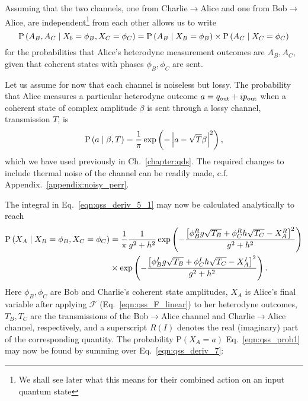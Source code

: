 Assuming that the two channels, one from Charlie$\rightarrow$Alice and one from Bob$\rightarrow$Alice, are independent\footnote{We shall see later what this means for their combined action on an input quantum state} from each other allows us to write
\begin{equation}\label{eqn:qss_deriv_6}
\text{P}\left(A_B, A_C \; \middle| \; X_b=\phi_B, X_C=\phi_C\right) = \text{P}\left(A_B \; \middle| \; X_B=\phi_B\right) \times \text{P}\left(A_C \; \middle| \; X_C=\phi_C\right)
\end{equation}
for the probabilities that Alice's heterodyne measurement outcomes are $A_B, A_C$, given that coherent states with phases $\phi_B, \phi_C$ are sent.

Let us assume for now that each channel is noiseless but lossy. The probability that Alice measures a particular heterodyne outcome $a = q_{\text{out}} + i p_{\text{out}}$ when a coherent state of complex amplitude $\beta$ is sent through a lossy channel, transmission $T$, is  %
\begin{equation}\label{eqn:qss_channel_classical_prob}
\text{P}\left(a \; \middle| \; \beta, T\right) = \frac{1}{\pi}\exp\left( - \left| a - \sqrt{T}\beta \right|^2\right),
\end{equation}
which we have used previously in Ch.~\ref{chapter:qds}. The required changes to include thermal noise of the channel can be readily made, c.f. Appendix.~\ref{appendix:noisy_perr}.

The integral in Eq.~\ref{eqn:qss_deriv_5_1} may now be calculated analytically to reach 
\begin{align}\label{eqn:qss_deriv_7}
\text{P}\left(X_A \given X_B=\phi_B, X_C=\phi_C\right) &= \frac{1}{\pi} \frac{1}{g^2 + h^2} \exp \left( - \frac{\left[\phi_B^R g \sqrt{T_B} + \phi_C^R h \sqrt{T_C} - X_A^R \right]^2}{g^2 + h^2}\right) \notag \\
%
&\times \exp \left( - \frac{\left[\phi_B^I g \sqrt{T_B} + \phi_C^I h \sqrt{T_C} - X_A^I \right]^2}{g^2 + h^2} \right).
\end{align}
Here $\phi_B, \phi_C$ are Bob and Charlie's coherent state amplitudes, $X_A$ is Alice's final variable after applying $\mathcal{F}$ (Eq.~\ref{eqn:qss_F_linear}) to her heterodyne outcomes, $T_B, T_C$ are the transmissions of the Bob$\rightarrow$Alice channel and Charlie$\rightarrow$Alice channel, respectively, and a superscript $R\left(I\right)$ denotes the real (imaginary) part of the corresponding quantity. %
The probability $\text{P}\left(X_A=a\right)$ Eq.~\ref{eqn:qss_prob1} may now be found by summing over Eq.~\ref{eqn:qss_deriv_7}:

